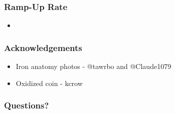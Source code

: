 \documentclass{beamer}
\begin{document}
\begin{frame}
\frametitle{Ramp-Up Rate}
\begin{itemize}
\item
\end{itemize}
\end{frame}

\begin{frame}
\frametitle{Acknowledgements}
\begin{itemize}
\item Iron anatomy photos - @tawrbo and @Claude1079
\item Oxidized coin - kcrow
\end{itemize}
\end{frame}

\begin{frame}
\frametitle{Questions?}
\end{frame}
\end{document}
